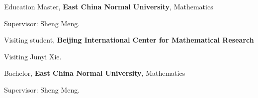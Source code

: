 \begin{rubric}{Education}
	\entry*[2026.09 -- ]
		Master, \textbf{East China Normal University}, Mathematics
		\par Supervisor: Sheng Meng.

	\entry*[Spring 2026]
		Visiting student, \textbf{Beijing International Center for Mathematical Research}
		\par Visiting Junyi Xie.

	\entry*[2021 -- 2025]%
		Bachelor, \textbf{East China Normal University}, Mathematics
		\par Supervisor: Sheng Meng.
\end{rubric}